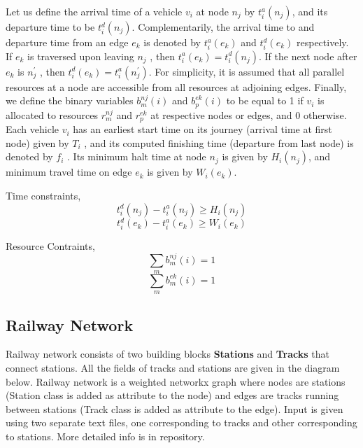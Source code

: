 \vspace{0.25cm}
Let us define the arrival time of a vehicle $v_i$ at node $n_j$ by
$t_{i}^{a} (n_j)$, and its departure time to be $t^{d}_{i} (n_j )$. Complementarily,
the arrival time to and departure time from an edge $e_k$ is
denoted by $t^{a}_{i} (e_k )$ and $t^{d}_{i} (e_k )$ respectively. If $e_k$ is traversed
upon leaving $n_j$ , then $t^{a}_{i}(e_k) = t^{d}_{i} (n_j )$. If the next node
after $e_k$ is $n_{j}^{'}$ , then $t^{d}_{i} (e_k ) = t^{a}_{i} (n_{j}^{'} )$. For simplicity, it is
assumed that all parallel resources at a node are accessible
from all resources at adjoining edges. Finally, we define the
binary variables $b^{nj}_{m}(i)$ and $b_{p}^{ek}(i)$ to be equal to 1 if $v_i$ is
allocated to resources $r_{m}^{nj}$ and $r_{p}^{ek}$ at respective nodes or
edges, and 0 otherwise. Each vehicle $v_i$ has an earliest start
time on its journey (arrival time at first node) given
by $T_i$ , and its computed finishing time (departure from last
node) is denoted by $f_i$ . Its minimum halt time at node $n_j$
is given by $H_i (n_j )$, and minimum travel time on edge $e_k$ is
given by $W_i (e_k )$.

\vspace{0.25cm}
Time constraints, $$t^{d}_{i} (n_{j} ) - t^{a}_{i} (n_{j} ) \geq H_{i} (n_{j} )$$
$$t^{d}_{i} (e_{k} ) - t^{a}_{i} (e_{k} ) \geq W_{i} (e_{k} )$$

Resource Contraints,
$$\sum_{m} b_{m}^{nj}(i) = 1$$
$$\sum_{m} b_{m}^{ek}(i) = 1$$

\subsection{Railway Network}


Railway network consists of two building blocks \textbf{Stations} and \textbf{Tracks} that connect
stations. All the fields of tracks and stations are given in the diagram below. Railway network is a weighted 
networkx graph where nodes are stations (Station class is added as attribute to the node) and edges are 
tracks running between stations (Track class is added as attribute to the edge). Input is given using two
separate text files, one corresponding to tracks and other corresponding to stations. More detailed info is 
in repository.


